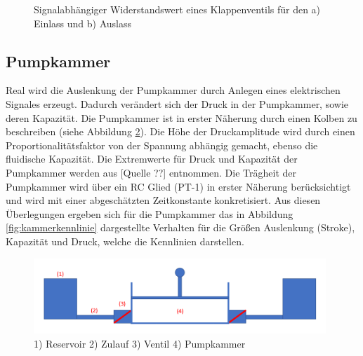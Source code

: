 \documentclass[fontsize=12pt, a4paper]{scrartcl}
\begin{document}
\begin{figure}[H]
\begin{subfigure}[H]{0.48\textwidth}
	\end{subfigure}
	\caption{Signalabhängiger Widerstandswert eines Klappenventils für den a) Einlass und b) Auslass}
	\label{fig:ventilkennlinie}
\end{figure}

\subsection{Pumpkammer}
Real wird die Auslenkung der Pumpkammer durch Anlegen eines elektrischen Signales erzeugt. Dadurch verändert sich der Druck in der Pumpkammer, sowie deren Kapazität. Die Pumpkammer ist in erster Näherung durch einen Kolben zu beschreiben (siehe Abbildung \ref{fig:kammerkonzept}). Die Höhe der Druckamplitude wird durch einen Proportionalitätsfaktor von der Spannung abhängig gemacht, ebenso die fluidische Kapazität. Die Extremwerte für Druck und Kapazität der Pumpkammer werden aus [Quelle ??] entnommen. Die Trägheit der Pumpkammer wird über ein RC Glied (PT-1) in erster Näherung berücksichtigt und wird mit einer abgeschätzten Zeitkonstante konkretisiert.
Aus diesen Überlegungen ergeben sich für die Pumpkammer das in Abbildung \ref{fig:kammerkennlinie} dargestellte Verhalten für die Größen Auslenkung (Stroke), Kapazität und Druck, welche die Kennlinien darstellen.

\begin{figure}[H]
	\centering
	\includegraphics[width=0.98\textwidth]{bilder/theorie/pumpe_prinzipskizze.PNG}
	\caption{1) Reservoir 2) Zulauf 3) Ventil 4) Pumpkammer}
	\label{fig:kammerkonzept}
\end{figure}
\end{document}

